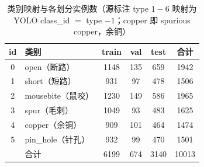 \begin{table}[t]
\centering
\caption{类别映射与各划分实例数（源标注 type $1\!-\!6$ 映射为 YOLO class\_id $=$ type $-1$；copper 即 spurious copper，余铜）}
\label{tab:classmap}
\small
\setlength{\tabcolsep}{3pt}
\begin{tabular}{clcccc}
\toprule
id & 类别 & train & val & test & 合计 \\
\midrule
0 & open（断路） & 1148 & 135 & 659 & 1942 \\
1 & short（短路） & 931 & 97 & 478 & 1506 \\
2 & mousebite（鼠咬） & 1230 & 149 & 586 & 1965 \\
3 & spur（毛刺） & 1049 & 93 & 483 & 1625 \\
4 & copper（余铜） & 909 & 101 & 464 & 1474 \\
5 & pin\_hole（针孔） & 932 & 99 & 470 & 1501 \\
\midrule
 & 合计 & 6199 & 674 & 3140 & 10013 \\
\bottomrule
\end{tabular}
\end{table}
